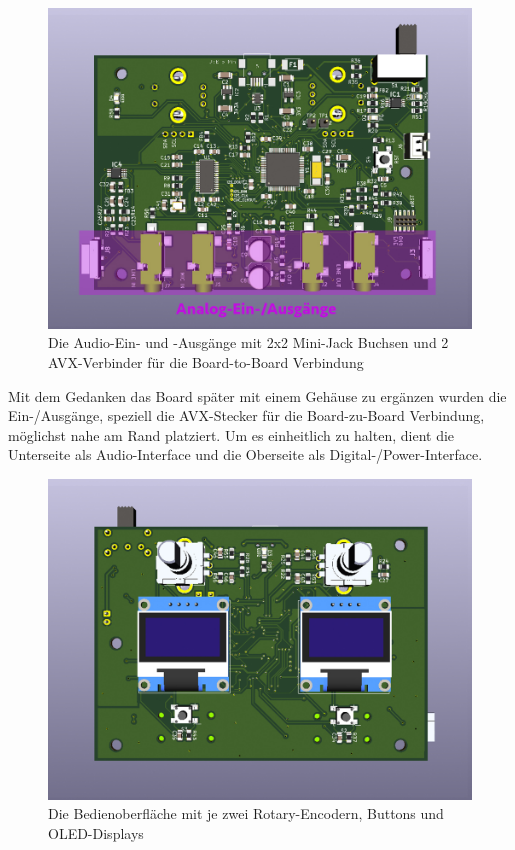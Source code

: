 \begin{figure} [H]
\begin{center}
 \includegraphics[scale=0.37]{../graphics/PCB-Layout_INOUT.jpg}
 \caption{Die Audio-Ein- und -Ausgänge mit 2x2 Mini-Jack Buchsen und 2 AVX-Verbinder für die Board-to-Board Verbindung}
\label{fig:PCB_INOUT}
\end{center}
\end{figure}

Mit dem Gedanken das Board später mit einem Gehäuse zu ergänzen wurden die Ein-/Ausgänge, speziell die AVX-Stecker für die Board-zu-Board Verbindung, möglichst nahe am Rand platziert. Um es einheitlich zu halten, dient die Unterseite als Audio-Interface und die Oberseite als Digital-/Power-Interface. 

\begin{figure} [H]
\begin{center}
 \includegraphics[scale=0.37]{../graphics/PCB-Layout_GUI.jpg}
 \caption{Die Bedienoberfläche mit je zwei Rotary-Encodern, Buttons und OLED-Displays}
\label{fig:PCB_INOUT}
\end{center}
\end{figure}


